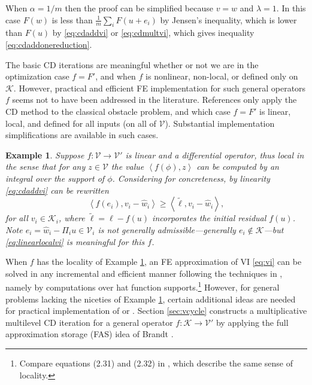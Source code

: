 \documentclass[letterpaper,final,12pt,reqno]{amsart}
\theoremstyle{cstyle}
\theoremstyle{cstyle*}
\theoremstyle{dstyle}
\newtheorem{example}[theorem]{Example}
\numberwithin{equation}{section}
\numberwithin{figure}{section}
\numberwithin{table}{section}
\numberwithin{theorem}{section}
\newcommand{\cK}{\mathcal{K}}
\newcommand{\cV}{\mathcal{V}}
\newcommand{\ip}[2]{\left<#1,#2\right>}
\begin{document}
When $\alpha=1/m$ then the  proof can be simplified because $v=w$ and $\lambda=1$.  In this case $F(w)$ is less than $\frac{1}{m} \sum_i F(u+e_i)$ by Jensen's inequality, which is lower than $F(u)$ by \eqref{eq:cdaddvi} or \eqref{eq:cdmultvi}, which gives inequality \eqref{eq:cdaddonereduction}.

The basic CD iterations are meaningful whether or not we are in the optimization case $f=F'$, and when $f$ is nonlinear, non-local, or defined only on $\cK$.  However, practical and efficient FE implementation for such general operators $f$ seems not to have been addressed in the literature.  References \cite{GraeserKornhuber2009,Tai2003} only apply the CD method to the classical obstacle problem, and which case $f=F'$ is linear, local, and defined for all inputs (on all of $\mathcal{V}$).  Substantial implementation simplifications are available in such cases.

\begin{example}  \label{ex:fnice} Suppose $f:\cV \to \cV'$ is linear and a differential operator, thus local in the sense that for any $z\in\mathcal{V}$ the value $\ip{f(\phi)}{z}$ can be computed by an integral over the support of $\phi$.  Considering  for concreteness, by linearity \eqref{eq:cdaddvi} can be rewritten
\begin{equation}
\ip{f(e_i)}{v_i-\hat w_i} \ge \ip{\tilde\ell}{v_i-\hat w_i}, \label{eq:linearlocalvi}
\end{equation}
for all $v_i \in \mathcal{K}_i$, where $\tilde\ell = \ell - f(u)$ incorporates the initial residual $f(u)$.  Note $e_i = \hat w_i - \Pi_i u \in \cV_i$ is not generally admissible---generally $e_i \notin \cK$---but \eqref{eq:linearlocalvi} is meaningful for this $f$.
\end{example}

When $f$ has the locality of Example \ref{ex:fnice}, an FE approximation of VI \eqref{eq:vi} can be solved in any incremental and efficient manner following the techniques in \cite{GraeserKornhuber2009,Tai2003}, namely by computations over hat function supports.\footnote{Compare equations (2.31) and (2.32) in \cite{Farrelletal2021}, which describe the same sense of locality.}  However, for general problems lacking the niceties of Example \ref{ex:fnice}, certain additional ideas are needed for practical implementation of  or .  Section \ref{sec:vcycle} constructs a multiplicative multilevel CD iteration for a general operator $f:\cK\to\cV'$ by applying the full approximation storage (FAS) idea of Brandt \cite{Brandt1977}.
\end{document}
